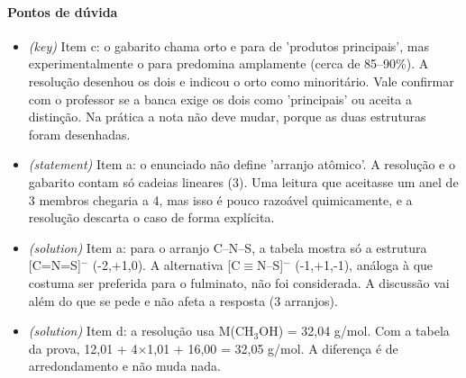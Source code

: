 \documentclass{article}%
\begin{document}
\paragraph{Pontos de dúvida}%
\begin{itemize}%
\item%
\textit{(key)} Item c: o gabarito chama orto e para de 'produtos principais', mas experimentalmente o para predomina amplamente (cerca de 85--90\%). A resolução desenhou os dois e indicou o orto como minoritário. Vale confirmar com o professor se a banca exige os dois como 'principais' ou aceita a distinção. Na prática a nota não deve mudar, porque as duas estruturas foram desenhadas.%
\item%
\textit{(statement)} Item a: o enunciado não define 'arranjo atômico'. A resolução e o gabarito contam só cadeias lineares (3). Uma leitura que aceitasse um anel de 3 membros chegaria a 4, mas isso é pouco razoável quimicamente, e a resolução descarta o caso de forma explícita.%
\item%
\textit{(solution)} Item a: para o arranjo C--N--S, a tabela mostra só a estrutura {[}C=N=S{]}$^{-}$ (-2,+1,0). A alternativa {[}C$\equiv$N--S{]}$^{-}$ (-1,+1,-1), análoga à que costuma ser preferida para o fulminato, não foi considerada. A discussão vai além do que se pede e não afeta a resposta (3 arranjos).%
\item%
\textit{(solution)} Item d: a resolução usa M(CH$_{3}$OH) = 32,04 g/mol. Com a tabela da prova, 12,01 + 4$\times$1,01 + 16,00 = 32,05 g/mol. A diferença é de arredondamento e não muda nada.%
\end{itemize}%
\end{document}
